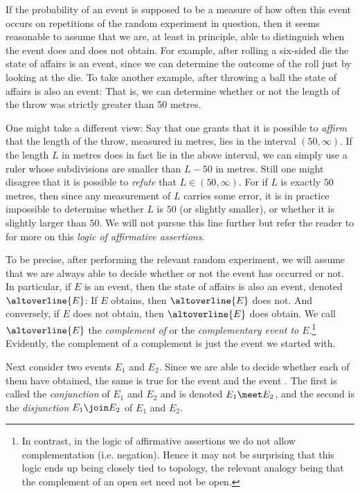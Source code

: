 \documentclass[article, a4paper, 11pt, oneside]{memoir}
\numberwithin{equation}{chapter}
\begin{document}
\newcommand{\compl}[1]{\altoverline{#1}}

If the probability of an event is supposed to be a measure of how often this event occurs on repetitions of the random experiment in question, then it seems reasonable to assume that we are, at least in principle, able to distinguish when the event does and does not obtain. For example, after rolling a six-sided die the state of affairs  is an event, since we can determine the outcome of the roll just by looking at the die. To take another example, after throwing a ball the state of affairs  is also an event: That is, we can determine whether or not the length of the throw was strictly greater than 50 metres.

One might take a different view: Say that one grants that it is possible to \emph{affirm} that the length of the throw, measured in metres, lies in the interval $(50,\infty)$. If the length $L$ in metres does in fact lie in the above interval, we can simply use a ruler whose subdivisions are smaller than $L - 50$ in metres. Still one might disagree that it is possible to \emph{refute} that $L \in (50, \infty)$. For if $L$ is exactly $50$ metres, then since any measurement of $L$ carries some error, it is in practice impossible to determine whether $L$ is $50$ (or slightly smaller), or whether it is slightly larger than $50$. We will not pursue this line further but refer the reader to \textcite{vickers1989} for more on this \emph{logic of affirmative assertions}.

To be precise, after performing the relevant random experiment, we will assume that we are always able to decide whether or not the event has occurred or not. In particular, if $E$ is an event, then the state of affairs  is also an event, denoted $\compl{E}$: If $E$ obtains, then $\compl{E}$ does not. And conversely, if $E$ does not obtain, then $\compl{E}$ does obtain. We call $\compl{E}$ the \emph{complement of} or the \emph{complementary event to $E$}.\footnote{In contrast, in the logic of affirmative assertions we do not allow complementation (i.e. negation). Hence it may not be surprising that this logic ends up being closely tied to topology, the relevant analogy being that the complement of an open set need not be open.} Evidently, the complement of a complement is just the event we started with.

Next consider two events $E_1$ and $E_2$. Since we are able to decide whether each of them have obtained, the same is true for the event  and the event . The first is called the \emph{conjunction} of $E_1$ and $E_2$ and is denoted $E_1 \meet E_2$, and the second is the \emph{disjunction} $E_1 \join E_2$ of $E_1$ and $E_2$.
\end{document}
